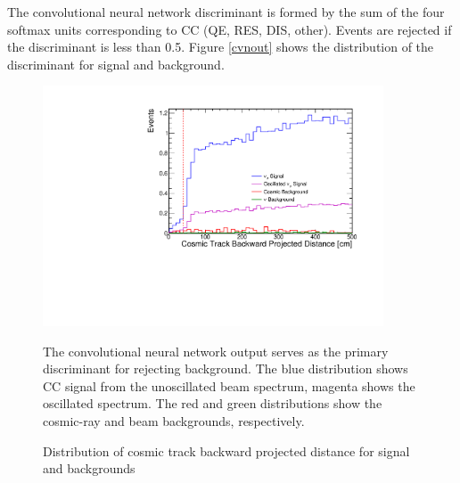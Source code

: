 The convolutional neural network discriminant is formed by the sum of the four
softmax units corresponding to \numu CC (QE, RES, DIS, other).
Events are rejected if the discriminant is less than 0.5.
Figure \ref{cvnout} shows the distribution of the discriminant for
signal and background.




\begin{figure}[t]
\begin{center}
\includegraphics[width=0.9\textwidth]{figures/selection/n1_cosbakdist.pdf}
\end{center}
\caption{Distribution of cosmic track backward projected distance for signal and backgrounds}{
The convolutional neural network output serves as the primary discriminant for
rejecting background.
The blue distribution shows \numu CC signal from the unoscillated beam spectrum,
magenta shows the oscillated spectrum.
The red and green distributions show the cosmic-ray and beam backgrounds,
respectively.
}
\label{cosbakdist}
\end{figure}
